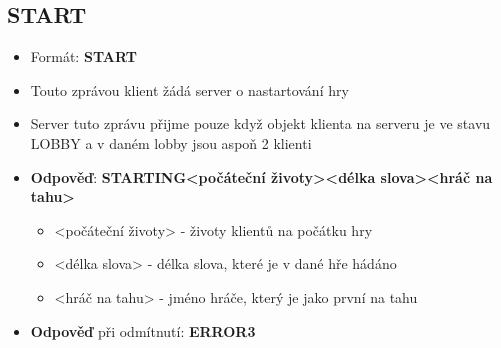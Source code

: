 \documentclass[12pt]{report}
\begin{document}
	\subsection{START} 		
		\begin{itemize}
			\item Formát: \textbf{START}
			\item Touto zprávou klient žádá server o nastartování hry
			\item Server tuto zprávu přijme pouze když objekt klienta na serveru je ve stavu LOBBY a v daném lobby jsou aspoň 2 klienti
			\item \textbf{Odpověď}:  \textbf{STARTING{\textbar}{\textless}počáteční životy{\textgreater}{\textbar}{\textless}délka slova{\textgreater}{\textbar}{\textless}hráč na tahu{\textgreater}}
			
			\begin{itemize}
				\item {\textless}počáteční životy{\textgreater} - životy klientů na počátku hry
				\item {\textless}délka slova{\textgreater} - délka slova, které je v dané hře hádáno
				\item {\textless}hráč na tahu{\textgreater} - jméno hráče, který je jako první na tahu
			\end{itemize}
			
			\item \textbf{Odpověď} při odmítnutí: \textbf{ERROR{\textbar}3}
		\end{itemize}
	
\end{document}
